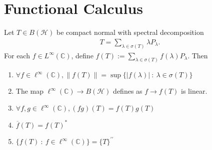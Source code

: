 \section{Functional Calculus}

\begin{theorem}
  Let $T \in B(\mathcal{H})$ be compact normal with spectral decomposition
  \begin{align*}
    T = \sum_{\lambda \in  \sigma(T)} \lambda P_\lambda.
  \end{align*}
  For each $f \in L^\infty(\mathbb{C})$, define $f(T) := \sum_{ \lambda \in
  \sigma(T)}  f(\lambda)   P_\lambda$. Then
  \begin{enumerate}[label=(\arabic*)]
    \item $\forall f \in \ell^\infty(\mathbb{C}), \|f(T)\| = \sup \{
      |f(\lambda)|  \ : \  \lambda \in \sigma(T) \}$
    \item The map $\ell^\infty(\mathbb{C}) \to B(\mathcal{H})$
      defines as $f \to f(T)$ is linear.
    \item $\forall f, g \in \ell^\infty(\mathbb{C}), (fg)(T) = f(T)g(T)$
    \item $\overline{f}(T) = f(T)^*$
    \item $ \{ f(T)  \ : \   f \in \ell^\infty(\mathbb{C}) \} = \{ T
      \}^{\prime \prime}$
  \end{enumerate}
\end{theorem}
